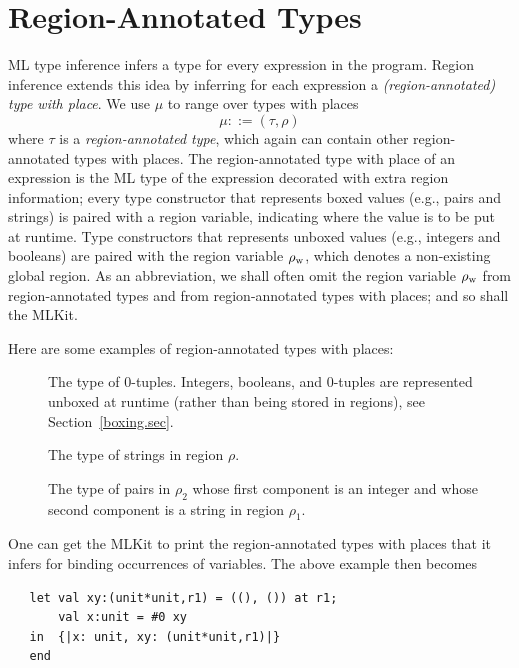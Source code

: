\documentclass[12pt]{book}
\newcommand{\rhoword}{\rho_{\rm w}}
\begin{document}
\section{Region-Annotated Types}
\label{reganntypes.sec}
ML type inference infers a type for every expression in the program.
Region inference extends this idea by inferring for each expression a
%
%
{\em (region-annotated) type with place}. We use $\mu$ to range over
types with places
$$\mu::=(\tau,\rho)$$
where $\tau$ is a {\em region-annotated type},
which again can contain other region-annotated types with places. The
region-annotated type with place of an expression is the ML type of
the expression decorated with extra region information; every type
constructor that represents boxed values (e.g., pairs and strings) is
paired with a region variable, indicating where the value is to be put
at runtime. Type constructors that represents unboxed values (e.g.,
integers and booleans) are paired with the region variable 
\index{$\rhoword$}%
$\rhoword$, which denotes a non-existing global region.
%
%
%
As an abbreviation, we shall often omit the region variable $\rhoword$
from region-annotated types and from region-annotated types with
places; and so shall the MLKit.

Here are some examples of region-annotated types with places:
\begin{description}
\item[] The type of 0-tuples.  Integers,
  booleans, and 0-tuples are represented 
  unboxed at runtime (rather than being stored in regions), see
  Section~\ref{boxing.sec}.
\item[] The type of strings in region
  $\rho$.
\item[] The type of pairs in $\rho_2$ whose first
  component is an integer and whose second component is a string in
  region $\rho_1$.
\end{description}

One can get the MLKit to print the region-annotated types with places
that it infers for binding occurrences of variables.  The above
example then becomes
\begin{verbatim}
   let val xy:(unit*unit,r1) = ((), ()) at r1; 
       val x:unit = #0 xy
   in  {|x: unit, xy: (unit*unit,r1)|}
   end 
\end{verbatim}
\end{document}
